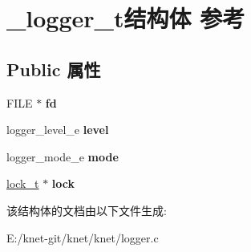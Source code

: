 \hypertarget{struct__logger__t}{}\section{\+\_\+logger\+\_\+t结构体 参考}
\label{struct__logger__t}
\subsection*{Public 属性}
\begin{DoxyCompactItemize}
\item 
\hypertarget{struct__logger__t_a72330b5809799b449e034987289c7ae5}{}F\+I\+L\+E $\ast$ {\bfseries fd}\label{struct__logger__t_a72330b5809799b449e034987289c7ae5}

\item 
\hypertarget{struct__logger__t_aea62dc2d11b22e3a6c689a7dccac9d78}{}logger\+\_\+level\+\_\+e {\bfseries level}\label{struct__logger__t_aea62dc2d11b22e3a6c689a7dccac9d78}

\item 
\hypertarget{struct__logger__t_a2c4fac533ec7a74d823ccfb25710216a}{}logger\+\_\+mode\+\_\+e {\bfseries mode}\label{struct__logger__t_a2c4fac533ec7a74d823ccfb25710216a}

\item 
\hypertarget{struct__logger__t_a321cb9563007ebbec8aaf91e6cb7b976}{}\hyperlink{struct__lock__t}{lock\+\_\+t} $\ast$ {\bfseries lock}\label{struct__logger__t_a321cb9563007ebbec8aaf91e6cb7b976}

\end{DoxyCompactItemize}


该结构体的文档由以下文件生成\+:\begin{DoxyCompactItemize}
\item 
E\+:/knet-\/git/knet/knet/logger.\+c\end{DoxyCompactItemize}
